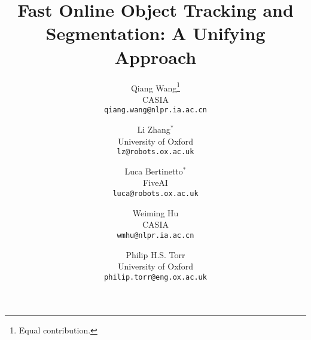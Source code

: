 \documentclass[10pt,twocolumn,letterpaper]{article}
\begin{document}
\title{Fast Online Object Tracking and Segmentation: A Unifying Approach}

\author{Qiang Wang\thanks{Equal contribution.}\\
CASIA\\
{\tt\small qiang.wang@nlpr.ia.ac.cn}
\and
Li Zhang$^*$\\
University of Oxford\\
{\tt\small lz@robots.ox.ac.uk}
\and
Luca Bertinetto$^*$\\
FiveAI\\
{\tt\small luca@robots.ox.ac.uk}
\and
Weiming Hu\\
CASIA\\
{\tt\small wmhu@nlpr.ia.ac.cn}
\and
Philip H.S. Torr\\
University of Oxford\\
{\tt\small philip.torr@eng.ox.ac.uk}
}

\maketitle















{\small


}
\clearpage

\end{document}
